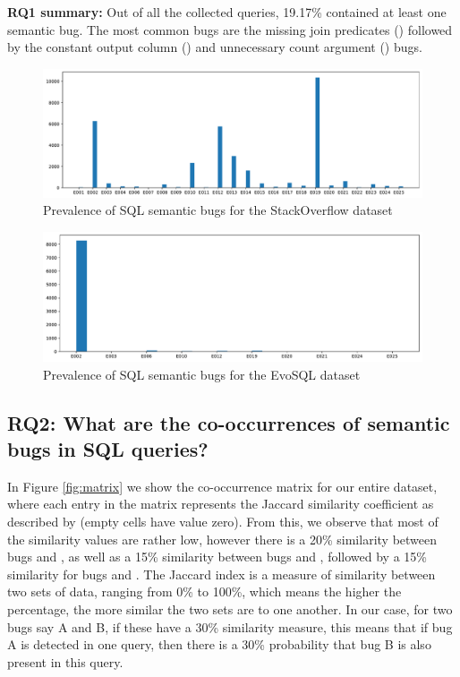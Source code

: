 \begin{mdframed}[default]
\noindent \textbf{RQ1 summary:} Out of all the collected queries, 19.17\% contained at least one semantic bug. The most common bugs are the missing join predicates () followed by the constant output column () and unnecessary count argument () bugs.
\end{mdframed}

\begin{figure}[ht]
    \centering
    \includegraphics[width=1\textwidth]{img/prevalence.pdf}
    \caption{Prevalence of SQL semantic bugs for the StackOverflow dataset}
    \label{fig:prevalence}
\end{figure}

\begin{figure}[ht]
    \centering
    \includegraphics[width=1\textwidth]{img/prevalence_evosql.pdf}
    \caption{Prevalence of SQL semantic bugs for the EvoSQL dataset}
    \label{fig:prevalence_evosql}
\end{figure}

\subsection{RQ2: What are the co-occurrences of semantic bugs in SQL queries?}

In Figure \ref{fig:matrix} we show the co-occurrence matrix for our entire dataset, where each entry in the matrix represents the Jaccard similarity coefficient as described by \citet{P012} (empty cells have value zero). From this, we observe that most of the similarity values are rather low, however there is a 20\% similarity between bugs  and , as well as a 15\% similarity between bugs  and , followed by a 15\% similarity for bugs  and . The Jaccard index is a measure of similarity between two sets of data, ranging from 0\% to 100\%, which means the higher the percentage, the more similar the two sets are to one another. In our case, for two bugs say A and B, if these have a 30\% similarity measure, this means that if bug A is detected in one query, then there is a 30\% probability that bug B is also present in this query.

